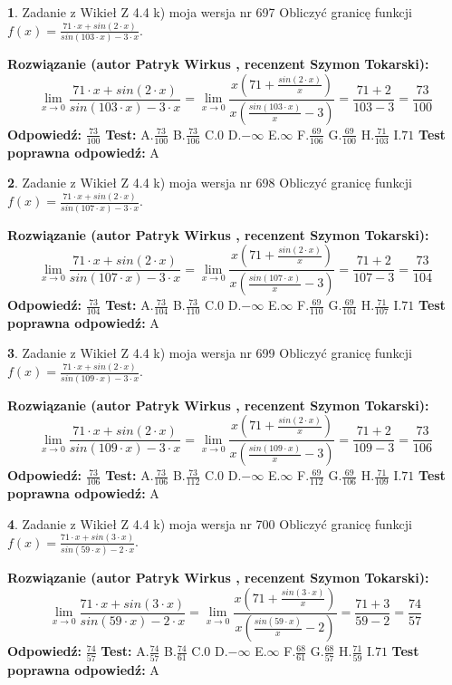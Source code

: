 \documentclass[12pt, a4paper]{article}
\theoremstyle{definition} %
\newtheorem{zad}{}
\newcommand{\zadStart}[1]{\begin{zad}#1\newline}
\newcommand{\zadStop}{\end{zad}}
\newcommand{\rozwStart}[2]{\noindent \textbf{Rozwiązanie (autor #1 , recenzent #2): }\newline}
\newcommand{\rozwStop}{\newline}
\newcommand{\odpStart}{\noindent \textbf{Odpowiedź:}\newline}
\newcommand{\odpStop}{\newline}
\newcommand{\testStart}{\noindent \textbf{Test:}\newline}
\newcommand{\testStop}{\newline}
\newcommand{\kluczStart}{\noindent \textbf{Test poprawna odpowiedź:}\newline}
\newcommand{\kluczStop}{\newline}
\begin{document}
\zadStart{Zadanie z Wikieł Z 4.4 k) moja wersja nr 697}
Obliczyć granicę funkcji $f(x)=\frac{71\cdot x +sin(2\cdot x)}{sin(103\cdot x) -3\cdot x}$.
\zadStop
\rozwStart{Patryk Wirkus}{Szymon Tokarski}
$$\lim\limits_{x\to 0}\frac{71\cdot x +sin(2\cdot x)}{sin(103\cdot x) -3\cdot x}
=\lim\limits_{x\to 0}\frac{x(71+\frac{sin(2\cdot x)}{x})}{x(\frac{sin(103\cdot x)}{x}-3)}
=\frac{71+2}{103-3} = \frac{73}{100}$$
\rozwStop
\odpStart
$\frac{73}{100}$
\odpStop
\testStart
A.$\frac{73}{100}$
B.$\frac{73}{106}$
C.$0$
D.$-\infty$
E.$\infty$
F.$\frac{69}{106}$
G.$\frac{69}{100}$
H.$\frac{71}{103}$
I.$71$
\testStop
\kluczStart
A
\kluczStop



\zadStart{Zadanie z Wikieł Z 4.4 k) moja wersja nr 698}
Obliczyć granicę funkcji $f(x)=\frac{71\cdot x +sin(2\cdot x)}{sin(107\cdot x) -3\cdot x}$.
\zadStop
\rozwStart{Patryk Wirkus}{Szymon Tokarski}
$$\lim\limits_{x\to 0}\frac{71\cdot x +sin(2\cdot x)}{sin(107\cdot x) -3\cdot x}
=\lim\limits_{x\to 0}\frac{x(71+\frac{sin(2\cdot x)}{x})}{x(\frac{sin(107\cdot x)}{x}-3)}
=\frac{71+2}{107-3} = \frac{73}{104}$$
\rozwStop
\odpStart
$\frac{73}{104}$
\odpStop
\testStart
A.$\frac{73}{104}$
B.$\frac{73}{110}$
C.$0$
D.$-\infty$
E.$\infty$
F.$\frac{69}{110}$
G.$\frac{69}{104}$
H.$\frac{71}{107}$
I.$71$
\testStop
\kluczStart
A
\kluczStop



\zadStart{Zadanie z Wikieł Z 4.4 k) moja wersja nr 699}
Obliczyć granicę funkcji $f(x)=\frac{71\cdot x +sin(2\cdot x)}{sin(109\cdot x) -3\cdot x}$.
\zadStop
\rozwStart{Patryk Wirkus}{Szymon Tokarski}
$$\lim\limits_{x\to 0}\frac{71\cdot x +sin(2\cdot x)}{sin(109\cdot x) -3\cdot x}
=\lim\limits_{x\to 0}\frac{x(71+\frac{sin(2\cdot x)}{x})}{x(\frac{sin(109\cdot x)}{x}-3)}
=\frac{71+2}{109-3} = \frac{73}{106}$$
\rozwStop
\odpStart
$\frac{73}{106}$
\odpStop
\testStart
A.$\frac{73}{106}$
B.$\frac{73}{112}$
C.$0$
D.$-\infty$
E.$\infty$
F.$\frac{69}{112}$
G.$\frac{69}{106}$
H.$\frac{71}{109}$
I.$71$
\testStop
\kluczStart
A
\kluczStop



\zadStart{Zadanie z Wikieł Z 4.4 k) moja wersja nr 700}
Obliczyć granicę funkcji $f(x)=\frac{71\cdot x +sin(3\cdot x)}{sin(59\cdot x) -2\cdot x}$.
\zadStop
\rozwStart{Patryk Wirkus}{Szymon Tokarski}
$$\lim\limits_{x\to 0}\frac{71\cdot x +sin(3\cdot x)}{sin(59\cdot x) -2\cdot x}
=\lim\limits_{x\to 0}\frac{x(71+\frac{sin(3\cdot x)}{x})}{x(\frac{sin(59\cdot x)}{x}-2)}
=\frac{71+3}{59-2} = \frac{74}{57}$$
\rozwStop
\odpStart
$\frac{74}{57}$
\odpStop
\testStart
A.$\frac{74}{57}$
B.$\frac{74}{61}$
C.$0$
D.$-\infty$
E.$\infty$
F.$\frac{68}{61}$
G.$\frac{68}{57}$
H.$\frac{71}{59}$
I.$71$
\testStop
\kluczStart
A
\kluczStop
\end{document}
